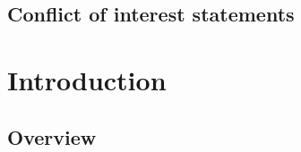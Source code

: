 \documentclass[
	12pt, %
	fleqn, %
	a4paper, %
	oneside, %
]{LegrandOrangeBook}
\begin{document}

\chapterspaceabove{6.75cm} %
\chapterspacebelow{7.25cm} %


\section{Conflict of interest statements}

\chapter{Introduction}
\section{Overview}

\end{document}
